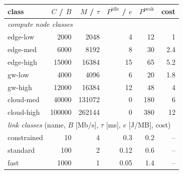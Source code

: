 \scriptsize
\begin{tabular}{lrrrrr}
\toprule
class & $C$ / $B$ & $M$ / $\tau$ & $P^{\mathrm{idle}}$ / $e$ & $P^{\mathrm{peak}}$ & cost \\
\midrule
\multicolumn{6}{l}{\emph{compute node classes}} \\
edge-low & 2000 & 2048 & 4 & 12 & 1 \\
edge-med & 6000 & 8192 & 8 & 30 & 2.4 \\
edge-high & 15000 & 16384 & 15 & 65 & 5.2 \\
gw-low & 4000 & 4096 & 6 & 20 & 1.8 \\
gw-high & 12000 & 16384 & 12 & 48 & 4 \\
cloud-med & 40000 & 131072 & 0 & 180 & 6 \\
cloud-high & 100000 & 262144 & 0 & 380 & 12 \\
\midrule \multicolumn{6}{l}{\emph{link classes} (name, $B$ [Mb/s], $\tau$ [ms], $e$ [J/MB], cost)} \\
constrained & 10 & 4 & 0.3 & 0.2 & -- \\
standard & 100 & 2 & 0.12 & 0.6 & -- \\
fast & 1000 & 1 & 0.05 & 1.4 & -- \\
\bottomrule
\end{tabular}

